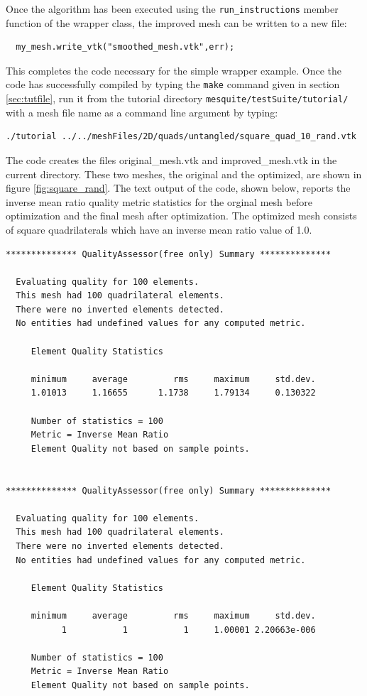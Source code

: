Once the algorithm has been executed using the {\tt run\_instructions} member
function of the wrapper class, the improved mesh can be written to a new
file:
\begin{verbatim}
  my_mesh.write_vtk("smoothed_mesh.vtk",err);
\end{verbatim}
This completes the code necessary for the simple wrapper example. Once
the code has successfully compiled by typing the {\tt make} command given in
section \ref{sec:tutfile},
run it from the tutorial directory \texttt{mesquite/testSuite/tutorial/}
with a mesh file name as a command line
argument by typing:
\begin{verbatim}
./tutorial ../../meshFiles/2D/quads/untangled/square_quad_10_rand.vtk
\end{verbatim}
The code creates the files original\_mesh.vtk
and improved\_mesh.vtk in the current directory.  These two meshes, the
original and the optimized, are
shown in figure \ref{fig:square_rand}.  The text output of the code,
shown below, reports the inverse mean ratio quality metric statistics for
the orginal mesh before optimization and the final mesh after optimization.
The optimized mesh consists
of square quadrilaterals which have an inverse mean ratio value of 1.0.
\begin{verbatim}
************** QualityAssessor(free only) Summary **************

  Evaluating quality for 100 elements.
  This mesh had 100 quadrilateral elements.
  There were no inverted elements detected.
  No entities had undefined values for any computed metric.

     Element Quality Statistics

     minimum     average         rms     maximum     std.dev.
     1.01013     1.16655      1.1738     1.79134     0.130322

     Number of statistics = 100
     Metric = Inverse Mean Ratio
     Element Quality not based on sample points.


************** QualityAssessor(free only) Summary **************

  Evaluating quality for 100 elements.
  This mesh had 100 quadrilateral elements.
  There were no inverted elements detected.
  No entities had undefined values for any computed metric.

     Element Quality Statistics

     minimum     average         rms     maximum     std.dev.
           1           1           1     1.00001 2.20663e-006

     Number of statistics = 100
     Metric = Inverse Mean Ratio
     Element Quality not based on sample points.
\end{verbatim}
